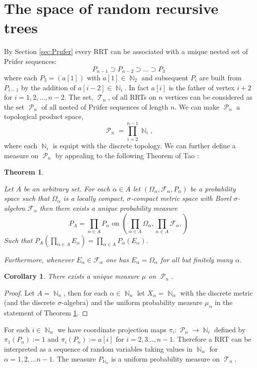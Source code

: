 \documentclass[oneside]{book} %
\newtheorem{theorem}{Theorem}
\newtheorem{cor}[thm]{Corollary}
\theoremstyle{definition}
\numberwithin{equation}{section}
\DeclareMathOperator{\T}{\mathcal{T}}
\DeclareMathOperator{\N}{\mathbb{N}}
\DeclareMathOperator{\Pruf}{\mathcal{P}} %
\begin{document}
\section{The space of random recursive trees}
By Section \ref{sec:Prufer} every RRT can be associated with a unique nested set of Pr\"{u}fer sequences:
\[P_{n-1} \supset P_{n-2} \supset \dots \supset P_3\]
where each $P_3 = (a[1])$ with $a[1] \in \N_2$ and subsequent $P_i$ are built from $P_{i-1}$ by the addition of $a[i-2] \in \N_{i}$.  In fact $a[i]$ is the father of vertex $i+2$ for $i = 1,2,\dots, n-2$.  The set, $\T_n$, of all RRTs on $n$ vertices can be considered as the set $\Pruf_n$ of all nested  of Pr\"{u}fer sequences of length $n$.  We can make $\Pruf_n$ a topological product space,
\[
 \Pruf_n = \prod_{i=2}^{n-1} \N_i,
\]
where each $\N_i$ is equipt with the discrete topology.  We can further define a measure on $\Pruf_n$ by appealing to the following Theorem of Tao \cite{Tao}:
\begin{theorem}\label{thm:tao}

 Let $A$ be an arbitrary set.  For each $\alpha \in A$ let $(\Omega_{\alpha},\mathcal{F}_\alpha,P_\alpha)$ be a probability space such that $\Omega_{\alpha}$ is a locally compact, $\sigma$-compact metric space with Borel $\sigma$-algebra $\mathcal{F}_{\alpha}$ then there exists a unique probability measure
 \[
  P_{A} = \prod_{\alpha \in A}P_\alpha \text{   on   } \left(\prod_{\alpha \in A}\Omega_\alpha, \prod_{\alpha \in A}\mathcal{F}_\alpha,\right)  
 \]
 Such that $P_A\left(\prod_{\alpha \in A}E_\alpha\right)  = \prod_{\alpha \in A} P_\alpha(E_\alpha)$.  
 
 Furthermore, whenever $E_\alpha \in \mathcal{F}_\alpha$ one has $E_\alpha = \Omega_{\alpha}$ for all but finitely many $\alpha$. 
\end{theorem}

\begin{cor}
 There exists a unique measure $\mu$ on $\Pruf_n$. 
\end{cor}

\begin{proof}
 Let $A = \N_n$, then for each $\alpha \in \N_n$ let $X_\alpha = \N_{\alpha}$ with the discrete metric (and the discrete $\sigma$-algebra) and the uniform probability measure $\mu_{\alpha}$ in the statement of Theorem \ref{thm:tao}.   
\end{proof}

For each $i \in \N_\alpha$ we have coordinate projection maps $\pi_{i} : \Pruf_n \rightarrow \N_i$ defined by $\pi_1(P_n):= 1$ and $\pi_i(P_n):= a[i]$ for $i = 2,3\dots,n-1$.  Therefore a RRT can be interpreted as a sequence of random variables taking values in $\N_{\alpha}$ for $\alpha  = 1,2,\dots n-1$.  The measure $P_{\N_n}$ is a uniform probability measure on $\T_n$.   
\end{document}
